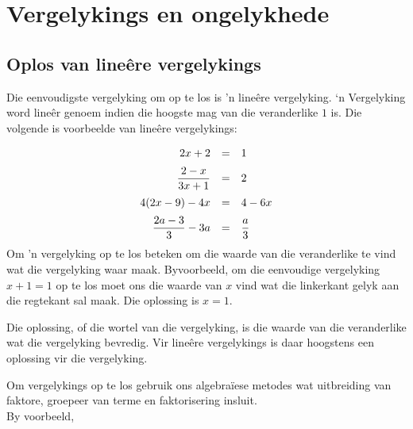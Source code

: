 \chapter{Vergelykings en ongelykhede}
\setcounter{figure}{1}
\setcounter{subfigure}{1}

\section{Oplos van lineêre vergelykings}
\nopagebreak

           
Die eenvoudigste vergelyking om op te los is ’n lineêre vergelyking. ‘n Vergelyking word lineêr genoem indien
die hoogste mag van die veranderlike $1$ is. Die volgende is voorbeelde van lineêre
vergelykings:\par 


\begin{equation*}
\begin{array}{ccl}\hfill 2x+2& =& 1\hfill \vspace{6pt} \\
 \hfill \dfrac{2-x}{3x+1}& =& 2\hfill \vspace{6pt} \\
\hfill 4(2x-9)-4x&=&4-6x \hfill  \vspace{6pt}\\ 
\hfill \dfrac{2a-3}{3}-3a&=&\dfrac{a}{3} \hfill\\
\end{array}
\end{equation*}
Om 'n vergelyking op te los beteken om die waarde van die veranderlike te vind wat die vergelyking waar maak. 
Byvoorbeeld, om die eenvoudige vergelyking $x+1=1$ op te los moet ons die waarde van $x$ vind wat die linkerkant gelyk aan die regtekant sal maak. Die oplossing is $x=1$.\par

Die oplossing, of die wortel van die vergelyking, is die waarde van die veranderlike wat die vergelyking bevredig. Vir lineêre vergelykings is daar 
 hoogstens een oplossing vir die vergelyking.\par
Om vergelykings op te los gebruik ons algebraïese metodes wat uitbreiding van faktore, groepeer van terme en faktorisering insluit.\\

By voorbeeld,

